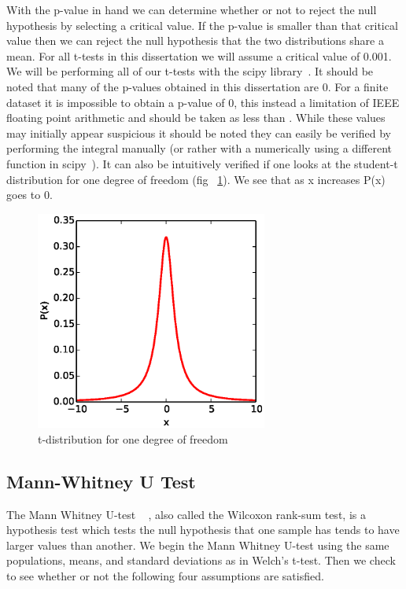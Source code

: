 With the p-value in hand we can determine whether or not to reject the null hypothesis by selecting a critical value. If the p-value is smaller than that critical value then we can reject the null hypothesis that the two distributions share a mean.  For all t-tests in this dissertation we will assume a critical value of 0.001. We will be performing all of our t-tests with the scipy library~\cite{jones_scipy:_2001}. It should be noted that many of the p-values obtained in this dissertation are 0. For a finite dataset it is impossible to obtain a p-value of 0, this instead a limitation of IEEE floating point arithmetic and should be taken as less than  . While these values may initially appear suspicious it should be noted they can easily be verified by performing the integral manually (or rather with a numerically using a different function in scipy~\cite{jones_scipy:_2001}).  It can also be intuitively verified if one looks at the student-t distribution for one degree of freedom (fig ~\ref{TDist}).  We see that as x increases P(x) goes to 0.  

\begin{figure}\label{TDist}
	  \centering
	  \includegraphics[width=3in]{figures/T_distribution_1df.eps}
	  \caption{t-distribution for one degree of freedom}
\end{figure}

\subsection{Mann-Whitney U Test}\label{sec:mannWhitney}

The Mann Whitney U-test ~\cite{wackerly_mathematical_2007} , also called the Wilcoxon rank-sum test, is a hypothesis test which tests the null hypothesis that one sample has tends to have larger values than another. We begin the Mann Whitney U-test using the same populations, means, and standard deviations as in Welch's t-test. Then we check to see whether or not the following four assumptions are satisfied. 

